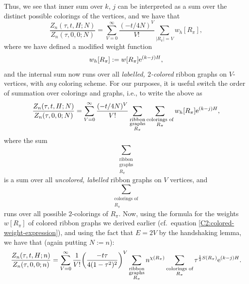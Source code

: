 \documentclass[10pt,a4paper]{amsart}
\numberwithin{equation}{section}
\begin{document}
Thus, we see that inner sum over $k$, $j$ can be interpreted as a sum over the distinct possible colorings of the vertices, and we have that
 \begin{equation*}
 \frac{Z_n(\tau,t,H;N)}{Z_n(\tau,0,0;N)} = \sum_{V = 0}^{\infty}\frac{(-t/4N)^V}{V!}\sum_{|R_{\pi}| = V} w_h[R_{\pi}],
 \end{equation*}
where we have defined a modified weight function
 \begin{equation*}
 w_h[R_{\pi}] := w[R_{\pi}]{\rm e}^{(k-j)H},
 \end{equation*}
and the internal sum now runs over all \textit{labelled, $2$-colored} ribbon graphs on $V$-vertices, with \textit{any} coloring scheme.
For our purposes, it is useful switch the order of summation over colorings and graphs, i.e., to write the above as
 \begin{equation*}
 \frac{Z_n(\tau,t,H;N)}{Z_n(\tau,0,0;N)} = \sum_{V = 0}^{\infty}\frac{(-t/4N)^V}{V!}\sum_{\substack{\text{ribbon}\\\text{graphs}\\ R_{\pi} }}\sum_{\substack{\text{colorings of} \\ R_{\pi} }} w_h[R_{\pi}] {\rm e}^{(k-j)H},
 \end{equation*}
where the sum
 \begin{equation*}
 \sum_{\substack{\text{ribbon}\\\text{graphs}\\ R_{\pi} }}
 \end{equation*}
is a sum over all \textit{uncolored, labelled} ribbon graphs on $V$ vertices, and
 \begin{equation*}
 \sum_{\substack{\text{colorings of} \\ R_{\pi} }}
 \end{equation*}
runs over all possible $2$-colorings of $R_{\pi}$. Now, using the formula for the weights $w[R_{\pi}]$ of colored ribbon graphs
we derived earlier (cf.\ equation \eqref{C2:colored-weight-expression}), and using the fact that $E = 2V$ by the handshaking lemma, we have that
(again putting $N := n$):
 \begin{equation*}
 \frac{Z_n(\tau,t,H;n)}{Z_n(\tau,0,0;n)} = \sum_{V = 0}^{\infty}\frac{1}{V!} \biggl(\frac{-t\tau}{4(1-\tau^2)^2}\biggr)^V\sum_{\substack{\text{ribbon}\\\text{graphs}\\ R_{\pi} }} n^{\chi(R_{\pi})}\sum_{\substack{\text{colorings of} \\ R_{\pi} }} \tau^{\frac{1}{2} S(R_{\pi})} {\rm e}^{(k-j)H}.
 \end{equation*}
\end{document}
